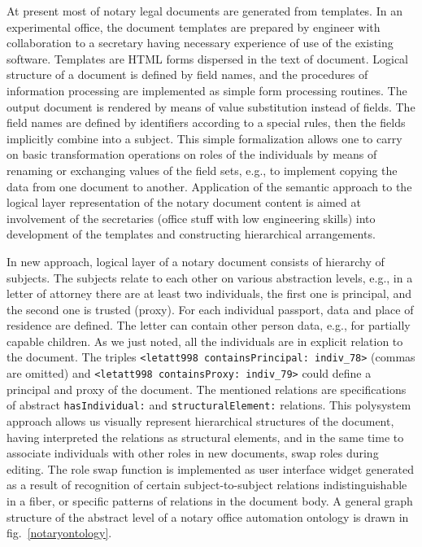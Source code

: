 \documentclass[conference]{IEEEtran}
\begin{document}
At present most of notary legal documents are generated from
templates.  In an experimental office, the document templates are
prepared by engineer with collaboration to a secretary having
necessary experience of use of the existing software.  Templates are
HTML forms dispersed in the text of document.  Logical structure of a
document is defined by field names, and the procedures of information
processing are implemented as simple form processing routines.  The
output document is rendered by means of value substitution instead of
fields.  The field names are defined by identifiers according to a
special rules, then the fields implicitly combine into a subject.
This simple formalization allows one to carry on basic transformation
operations on roles of the individuals by means of renaming or
exchanging values of the field sets, e.g., to implement copying the
data from one document to another.  Application of the semantic
approach to the logical layer representation of the notary document
content is aimed at involvement of the secretaries (office stuff with
low engineering skills) into development of the templates and
constructing hierarchical arrangements.

In new approach, logical layer of a notary document consists of
hierarchy of subjects.  The subjects relate to each other on various
abstraction levels, e.g., in a letter of attorney there are at least
two individuals, the first one is principal, and the second one is
trusted (proxy).  For each individual passport, data and place of
residence are defined.  The letter can contain other person data,
e.g., for partially capable children.  As we just noted, all the
individuals are in explicit relation to the document.  The triples
\texttt{<letatt998 containsPrincipal: indiv\_78>} (commas are omitted)
and \texttt{<letatt998 containsProxy: indiv\_79>} could define a
principal and proxy of the document.  The mentioned relations are
specifications of abstract \texttt{hasIndividual:} and
\texttt{structuralElement:} relations.  This polysystem approach
allows us visually represent hierarchical structures of the document,
having interpreted the relations as structural elements, and in the
same time to associate individuals with other roles in new documents,
swap roles during editing.  The role swap function is implemented as
user interface widget generated as a result of recognition of certain
subject-to-subject relations indistinguishable in a fiber, or specific
patterns of relations in the document body.  A general graph structure
of the abstract level of a notary office automation ontology is drawn
in fig.~\ref{notaryontology}.
\end{document}
